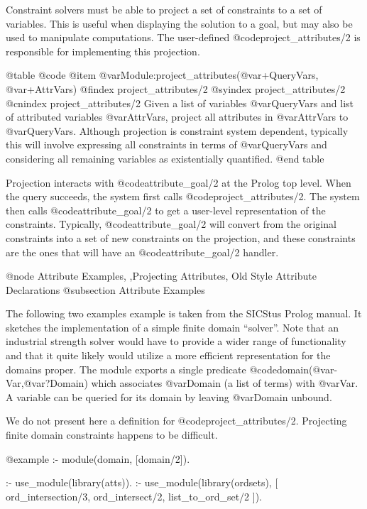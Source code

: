 {{{{{{{{{Constraint solvers must be able to project a set of constraints to a set
of variables. This is useful when displaying the solution to a goal, but
may also be used to manipulate computations. The user-defined
@code{project_attributes/2} is responsible for implementing this
projection.


@table @code
@item @var{Module}:project_attributes(@var{+QueryVars}, @var{+AttrVars})
@findex project_attributes/2
@syindex project_attributes/2
@cnindex project_attributes/2
Given a list of variables @var{QueryVars} and list of attributed
variables @var{AttrVars}, project all attributes in @var{AttrVars} to
@var{QueryVars}. Although projection is constraint system dependent,
typically this will involve expressing all constraints in terms of
@var{QueryVars} and considering all remaining variables as existentially
quantified.
@end table

Projection interacts with @code{attribute_goal/2} at the Prolog top
level. When the query succeeds, the system first calls
@code{project_attributes/2}. The system then calls
@code{attribute_goal/2} to get a user-level representation of the
constraints. Typically, @code{attribute_goal/2} will convert from the
original constraints into a set of new constraints on the projection,
and these constraints are the ones that will have an
@code{attribute_goal/2} handler.

@node Attribute Examples, ,Projecting Attributes, Old Style Attribute Declarations
@subsection Attribute Examples

The following two examples example is taken from the SICStus Prolog manual. It
sketches the implementation of a simple finite domain ``solver''.  Note
that an industrial strength solver would have to provide a wider range
of functionality and that it quite likely would utilize a more efficient
representation for the domains proper.  The module exports a single
predicate @code{domain(@var{-Var},@var{?Domain})} which associates
@var{Domain} (a list of terms) with @var{Var}.  A variable can be
queried for its domain by leaving @var{Domain} unbound.

We do not present here a definition for @code{project_attributes/2}.
Projecting finite domain constraints happens to be difficult.


@example
:- module(domain, [domain/2]).

:- use_module(library(atts)).
:- use_module(library(ordsets), [
        ord_intersection/3,
        ord_intersect/2,
        list_to_ord_set/2
   ]).

}}}}}}}}}
